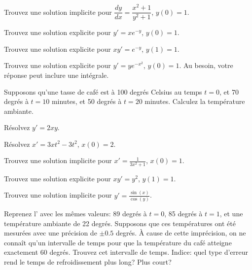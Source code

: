 \begin{exercise}
	Trouvez une solution implicite pour
	$\dfrac{dy}{dx} = \dfrac{x^2+1}{y^2+1}$, $y(0) = 1$.
\end{exercise}

\begin{exercise}
	Trouvez une solution explicite pour $y' = xe^{-y}$, $y(0)=1$.
\end{exercise}

\begin{exercise}
	Trouvez une solution explicite pour $xy' = e^{-y}$, $y(1)=1$.
\end{exercise}

\begin{exercise}
	Trouvez une solution explicite pour $y' = ye^{-x^2}$, $y(0)=1$.
	Au besoin, votre réponse peut inclure une intégrale.
\end{exercise}

\begin{exercise}
	Supposons qu'une tasse de café est à 100 degrés Celsius au temps $t=0$,
	et 70 degrés à $t=10$ minutes, et 50 degrés à $t=20$ minutes.
	Calculez la température ambiante.
\end{exercise}

\setcounter{exercise}{100}

\begin{exercise}
Résolvez $y'=2xy$.
\end{exercise}

\begin{exercise}
	Résolvez $x'=3xt^2-3t^2$, $x(0)=2$.
\end{exercise}

\begin{exercise}
	Trouvez une solution implicite pour $x'=\frac{1}{3x^2+1}$, $x(0)=1$.
\end{exercise}

\begin{exercise}
	Trouvez une solution explicite pour $x y' = y^2$, $y(1) = 1$.
\end{exercise}

\begin{exercise}
Trouvez une solution implicite pour $y' = \frac{\sin(x)}{\cos(y)}$.
\end{exercise}

\begin{exercise}
	Reprenez l' avec les mêmes valeurs: 89 degrés à $t=0$, 85 degrés à $t=1$, et une température ambiante de 22 degrés.
	Supposons que ces températures ont été mesurées avec une précision de $\pm 0.5$ degrés.
	À cause de cette imprécision, on ne connaît qu'un intervalle de temps pour
	que la température du café atteigne exactement 60 degrés.
	Trouvez cet intervalle de temps.
	Indice: quel type d'erreur rend le temps de refroidissement plus long? Plus court?
\end{exercise}

